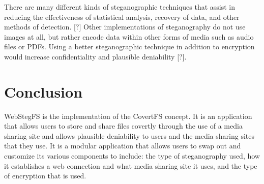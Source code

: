 \documentclass[12pt,journal,compsoc]{IEEEtran}
\begin{document}
There are many different kinds of steganographic techniques that assist in reducing the effectiveness of statistical analysis, recovery of data, and other methods of detection. [?] Other implementations of steganography do not use images at all, but rather encode data within other forms of media such as audio files or PDFs. Using a better steganographic technique in addition to encryption would increase confidentiality and plausible deniability [?]. 

\section{Conclusion}

WebStegFS is the implementation of the CovertFS concept. It is an application that allows users to store and share files covertly through the use of a media sharing site and allows plausible deniability to users and the media sharing sites that they use. It is a modular application that allows users to swap out and customize its various components to include: the type of steganography used, how it establishes a web connection and what media sharing site it uses, and the type of encryption that is used. 



\end{document}
